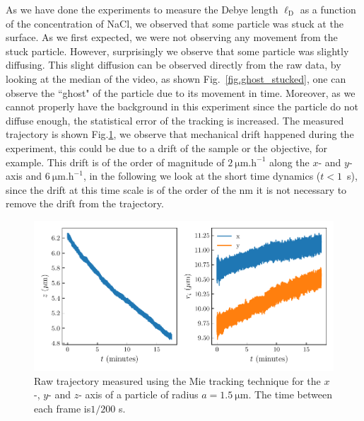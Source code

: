 As we have done the experiments to measure the Debye length $\ell _\mathrm{D}$ as a function of the concentration of NaCl, we observed that some particle was stuck at the surface. As we first expected, we were not observing any movement from the stuck particle. However, surprisingly we observe that some particle was slightly diffusing. This slight diffusion can be observed directly from the raw data, by looking at the median of the video, as shown Fig.~\ref{fig.ghost_stucked}, one can observe the ``ghost" of the particle due to its movement in time. Moreover, as we cannot properly have the background in this experiment since the particle do not diffuse enough, the statistical error of the tracking is increased. The measured trajectory is shown Fig.\ref{fig.trajectory_stuck}, we observe that mechanical drift happened during the experiment, this could be due to a drift of the sample or the objective, for example. This drift is of the order of magnitude of $2 ~ \mathrm{\mu m.h^{-1}}$ along the $x$- and $y$-axis and  $6 ~ \mathrm{\mu m.h^{-1}}$, in the following we look at the short time dynamics ($t < 1$~s), since the drift at this time scale is of the order of the nm it is not necessary to remove the drift from the trajectory.

\begin{figure}[H]
	\centering
	\includegraphics{02_body/chapter4/images/stucked_particle/trajectory_stucked.pdf}
	\caption{Raw trajectory measured using the Mie tracking technique for the $x$-, $y$- and $z$- axis of a particle of radius $a=1.5 ~\mathrm{\mu m}$. The time between each frame is$1/200$ s. }
	\label{fig.trajectory_stuck}
\end{figure}



